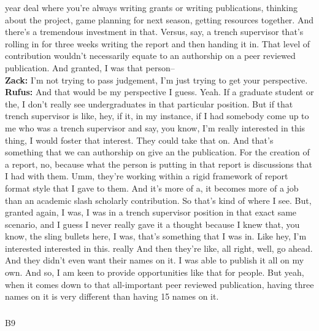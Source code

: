 \documentclass[
  canadian,
]{article}
\makeatletter
\let\oldsubparagraph\subparagraph
\renewcommand{\subparagraph}{
    \@ifstar
      \xxxSubParagraphStar
      \xxxSubParagraphNoStar
  }
\newcommand{\xxxSubParagraphStar}[1]{\oldsubparagraph*{#1}\mbox{}}
\newcommand{\xxxSubParagraphNoStar}[1]{\oldsubparagraph{#1}\mbox{}}
\makeatother
\begin{document}
year deal where you're always writing grants or writing publications,
thinking about the project, game planning for next season, getting
resources together. And there's a tremendous investment in that. Versus,
say, a trench supervisor that's rolling in for three weeks writing the
report and then handing it in. That level of contribution wouldn't
necessarily equate to an authorship on a peer reviewed publication. And
granted, I was that person--\\
\textbf{Zack:} I'm not trying to pass judgement, I'm just trying to get
your perspective.\\
\textbf{Rufus:} And that would be my perspective I guess. Yeah. If a
graduate student or the, I don't really see undergraduates in that
particular position. But if that trench supervisor is like, hey, if it,
in my instance, if I had somebody come up to me who was a trench
supervisor and say, you know, I'm really interested in this thing, I
would foster that interest. They could take that on. And that's
something that we can authorship on give an the publication. For the
creation of a report, no, because what the person is putting in that
report is discussions that I had with them. Umm, they're working within
a rigid framework of report format style that I gave to them. And it's
more of a, it becomes more of a job than an academic slash scholarly
contribution. So that's kind of where I see. But, granted again, I was,
I was in a trench supervisor position in that exact same scenario, and I
guess I never really gave it a thought because I knew that, you know,
the sling bullets here, I was, that's something that I was in. Like hey,
I'm interested interested in this. really And then they're like, all
right, well, go ahead. And they didn't even want their names on it. I
was able to publish it all on my own. And so, I am keen to provide
opportunities like that for people. But yeah, when it comes down to that
all-important peer reviewed publication, having three names on it is
very different than having 15 names on it.

\subparagraph{B9}\label{sec-B9}
\end{document}
